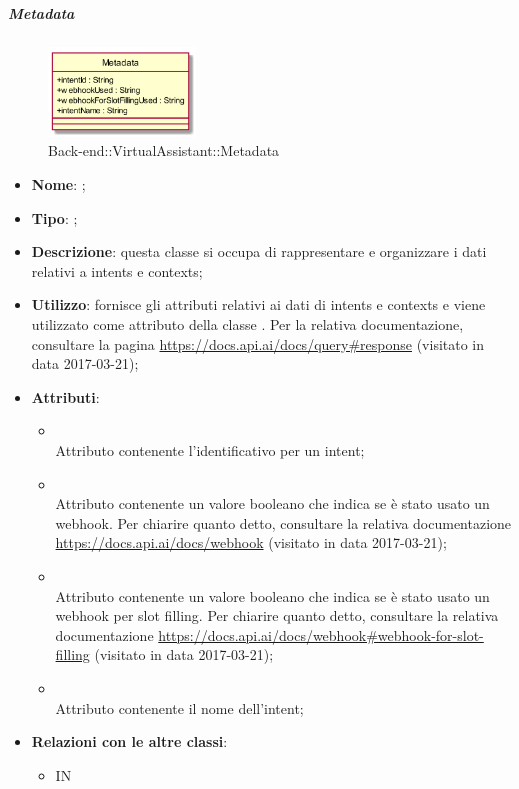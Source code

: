 \hypertarget{Metadata_label}{\subparagraph{Metadata}}
\begin{figure}[h]
	\centering
	\includegraphics[width=0.35\textwidth,height=\textheight,keepaspectratio]{images/ClassMetadata.png}
	\caption{Back-end::VirtualAssistant::Metadata}
\end{figure}
\begin{itemize}
	\item \textbf{Nome}: ;
	\item \textbf{Tipo}: ;
	\item \textbf{Descrizione}: questa classe si occupa di rappresentare e organizzare i dati relativi a intents e contexts;
	\item \textbf{Utilizzo}: fornisce gli attributi relativi ai dati di intents e contexts e viene utilizzato come attributo della classe .
	Per la relativa documentazione, consultare la pagina \url{https://docs.api.ai/docs/query#response}  (visitato in data 2017-03-21);
	\item \textbf{Attributi}:
	\begin{itemize}
		\item[]  \\
		Attributo contenente l'identificativo per un intent;
		\item[]  \\
		Attributo contenente un valore booleano che indica se è stato usato un webhook. Per chiarire quanto detto, consultare la relativa documentazione \url{https://docs.api.ai/docs/webhook}  (visitato in data 2017-03-21);
		\item[]  \\
		Attributo contenente un valore booleano che indica se è stato usato un webhook per slot filling.
		Per chiarire quanto detto, consultare la relativa documentazione \url{https://docs.api.ai/docs/webhook#webhook-for-slot-filling}  (visitato in data 2017-03-21);
		\item[]  \\
		Attributo contenente il nome dell'intent;
	\end{itemize}
	\item \textbf{Relazioni con le altre classi}:
	\begin{itemize}
		\item IN \hyperlink{ProcessingResult_label}{}
	\end{itemize}
\end{itemize}
\FloatBarrier

